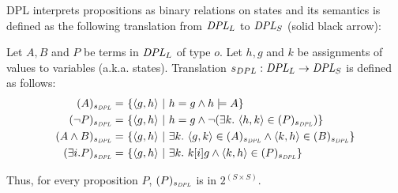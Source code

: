 DPL interprets propositions as binary relations on states and its semantics is defined as the following translation from $\textit{DPL}_L$ to $\textit{DPL}_{S}$ (solid black arrow):
\begin{definition} Let $A, B$ and $P$ be terms in $\textit{DPL}_L$ of type $o$. Let $h, g$ and $k$ be assignments of values to variables (a.k.a. states). Translation $s_{DPL}:  \textit{DPL}_L \rightarrow \textit{DPL}_{S}$ is defined as follows:
\begin{align*}
( A )_{s_\textit{DPL}} = \ & \{ \langle g , h \rangle \ | \ h = g \land h  \models A \} \\
( \neg P )_{s_\textit{DPL}} = \ & \{ \langle g , h \rangle \ | \ h = g \land \neg ( \exists k.  \ \langle h, k \rangle \in  ( P )_{s_\textit{DPL}} ) \} \\
( A \land B )_{s_\textit{DPL}} = \ & \{ \langle g , h \rangle \ |  \ \exists k. \ \langle g, k \rangle \in  ( A )_{s_\textit{DPL}}  \land   \langle k, h \rangle \in  ( B )_{s_\textit{DPL}}  \} \\
( \exists i. P )_{s_\textit{DPL}} = \ & \{ \langle g , h \rangle \ |  \ \exists k.  \  k [i] g \land  \langle k, h \rangle \in  ( P )_{s_\textit{DPL}} \} 
\end{align*}
\end{definition}
\noindent Thus, for every proposition $P$, $( P )_{s_\textit{DPL}}$ is in $2^{(S \times S)}$.
%

